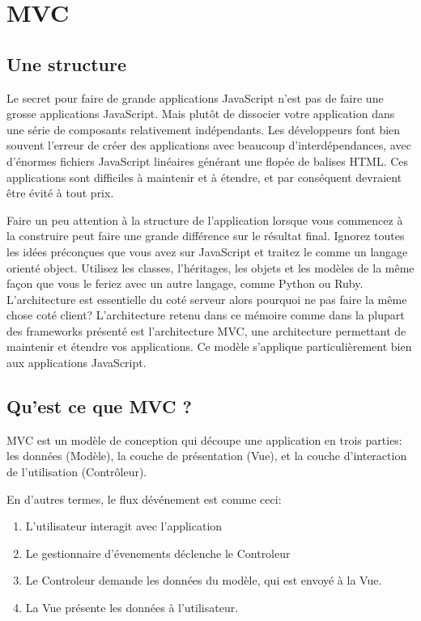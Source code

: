 \section{MVC}
\label{ch:mvc}

\subsection{Une structure}


Le secret pour faire de grande applications JavaScript n’est pas de faire une grosse applications JavaScript. Mais plutôt de dissocier votre application dans une série de composants relativement indépendants. Les développeurs font bien souvent l’erreur de créer des applications avec beaucoup d’interdépendances, avec d’énormes fichiers JavaScript linéaires générant une flopée de balises HTML. Ces applications sont difficiles à maintenir et à étendre, et par conséquent devraient être évité à tout prix.

Faire un peu attention à la structure de l'application lorsque vous commencez à la construire peut faire une grande différence sur le résultat final. Ignorez toutes les idées préconçues que vous avez sur JavaScript et traitez le comme un langage orienté object. Utilisez les classes, l’héritages, les objets et les modèles de la même façon que vous le feriez avec un autre langage, comme Python ou Ruby. L’architecture est essentielle du coté serveur alors pourquoi ne pas faire la même chose coté client?  L’architecture retenu dans ce mémoire comme dans la plupart des frameworks présenté est l’architecture MVC, une architecture permettant de maintenir et étendre vos applications. Ce modèle s’applique particulièrement bien aux applications JavaScript.

\subsection{Qu’est ce que MVC ?}


MVC est un modèle de conception qui découpe une application en trois parties: les données (Modèle), la couche de présentation (Vue), et la couche d’interaction de l’utilisation (Contrôleur).

En d’autres termes, le flux dévénement est comme ceci:

\begin{enumerate}

  \item
  L’utilisateur interagit avec l’application

  \item
  Le gestionnaire d’évenements déclenche le Controleur

  \item
  Le Controleur demande les données du modèle, qui est envoyé à la Vue.

  \item
  La Vue présente les données à l’utilisateur.

\end{enumerate}

